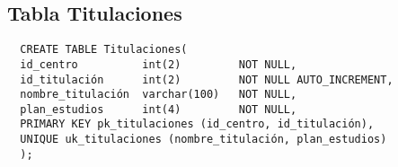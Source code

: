 \subsection{Tabla Titulaciones}

\begin{verbatim}
  CREATE TABLE Titulaciones(
  id_centro          int(2)         NOT NULL,
  id_titulación      int(2)         NOT NULL AUTO_INCREMENT,
  nombre_titulación  varchar(100)   NOT NULL,
  plan_estudios      int(4)         NOT NULL,
  PRIMARY KEY pk_titulaciones (id_centro, id_titulación),
  UNIQUE uk_titulaciones (nombre_titulación, plan_estudios)
  );
\end{verbatim}